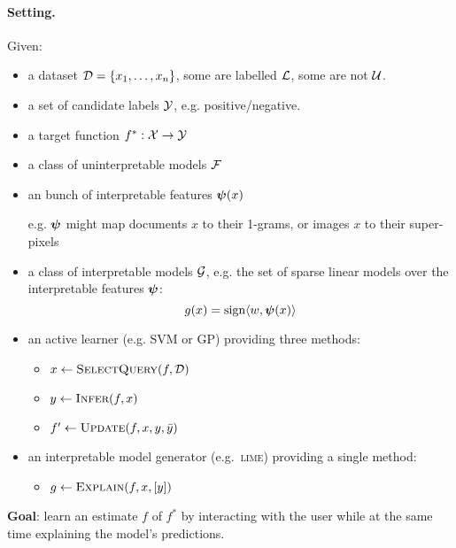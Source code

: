 \documentclass[a4paper,12pt]{article}
\newcommand{\lime}{\textsc{lime}}
\begin{document}
\paragraph{Setting.} Given:
%
\begin{itemize}

    \item a dataset $\mathcal{D} = \{ x_1, \ldots, x_n \}$, some are
        labelled $\mathcal{L}$, some are not $\mathcal{U}$.

    \item a set of candidate labels $\mathcal{Y}$, e.g. positive/negative.

    \item a target function $f^* : \mathcal{X} \to \mathcal{Y}$

    \item a class of uninterpretable models $\mathcal{F}$

    \item an bunch of interpretable features $\boldsymbol{\psi}(x)$

        e.g. $\boldsymbol{\psi}$ might map documents $x$ to their 1-grams, or images $x$ to
        their super-pixels

    \item a class of interpretable models $\mathcal{G}$, e.g. the set
        of sparse linear models over the interpretable features $\boldsymbol{\psi}$:
        $$ g(x) = \text{sign}{\langle w, \ensuremath{\boldsymbol{\psi}}(x) \rangle} $$

    \item an active learner (e.g. SVM or GP) providing three methods:

        \begin{itemize}
            \item $x \gets \textsc{SelectQuery}(f,\mathcal{D})$
            \item $y \gets \textsc{Infer}(f,x)$
            \item $f' \gets \textsc{Update}(f,x,y,\bar{y})$
        \end{itemize}

    \item an interpretable model generator (e.g.~\lime) providing a single method:

        \begin{itemize}
            \item $g \gets \textsc{Explain}(f,x,[y])$
        \end{itemize}

\end{itemize}

\noindent
\textbf{Goal}: learn an estimate $f$ of $f^*$ by interacting with the user
while at the same time explaining the model's predictions.
\end{document}
